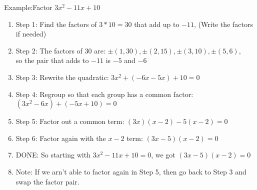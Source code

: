 \documentclass[12pt]{article}
\begin{document}
\noindent
    Example:Factor $3x^2-11x+10$
    \begin{enumerate}
    \renewcommand{\labelenumi}{}
    \item Step 1: Find the factors of $3*10=30$ that add up to $-11$, (Write the factors if needed)
    \item Step 2: The factors of $30$ are: $\pm(1,30), \pm(2,15),\pm(3,10),\pm(5,6)$, \\
          \hspace*{1.1cm} so the pair that adds to $-11$ is $-5$ and $-6$
    \item Step 3: Rewrite the quadratic:                          \hspace*{120pt} $3x^2+(-6x-5x)+10=0$
    \item Step 4: Regroup so that each group has a common factor: $(3x^2-6x)+(-5x+10)=0$
    \item Step 5: Factor out a common term:                       \hspace*{100pt} $(3x)(x-2)-5(x-2)=0$
    \item Step 6: Factor again with the $x-2$ term:               \hspace*{115pt}  $(3x-5)(x-2)=0 $
    \item DONE: So starting with $3x^2-11x+10=0$, we got $(3x-5)(x-2)=0$
    \item Note: If we arn't able to factor again in Step 5, then go back to Step 3 and swap the factor pair.

    \end{enumerate}
\end{document}
